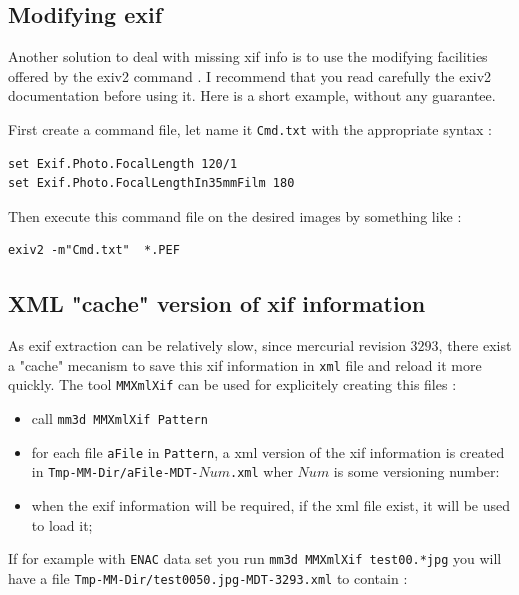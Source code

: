 \subsection{Modifying  exif}

Another solution to deal with missing xif info is to use the 
modifying facilities offered by the  exiv2 command .
I recommend that you read carefully
the exiv2 documentation before using it. Here is a short example,
without  any guarantee.

First create a command file, let name it {\tt Cmd.txt} with the appropriate syntax :

\begin{verbatim}
set Exif.Photo.FocalLength 120/1
set Exif.Photo.FocalLengthIn35mmFilm 180
\end{verbatim}

Then execute this command file on the desired images by something like :

\begin{verbatim}
exiv2 -m"Cmd.txt"  *.PEF
\end{verbatim}



\subsection{XML "cache" version of xif information}

As exif extraction can be relatively slow, since mercurial revision $3293$, there exist a
"cache" mecanism to save this xif information in {\tt xml} file and reload it more quickly.
The tool {\tt MMXmlXif} can be used for explicitely creating this files :

\begin{itemize}
   \item call {\tt mm3d MMXmlXif Pattern} 
   \item  for each file {\tt aFile} in {\tt Pattern}, a xml version of the xif information is created in
          {\tt Tmp-MM-Dir/aFile-MDT-$Num$.xml}  wher $Num$ is some versioning number:
    \item when the exif information will be required, if the  xml file exist, it will be used to load it;
\end{itemize}

If for example with {\tt ENAC} data set you run {\tt mm3d MMXmlXif test00.*jpg} 
you will have a file {\tt Tmp-MM-Dir/test0050.jpg-MDT-3293.xml} to contain :


